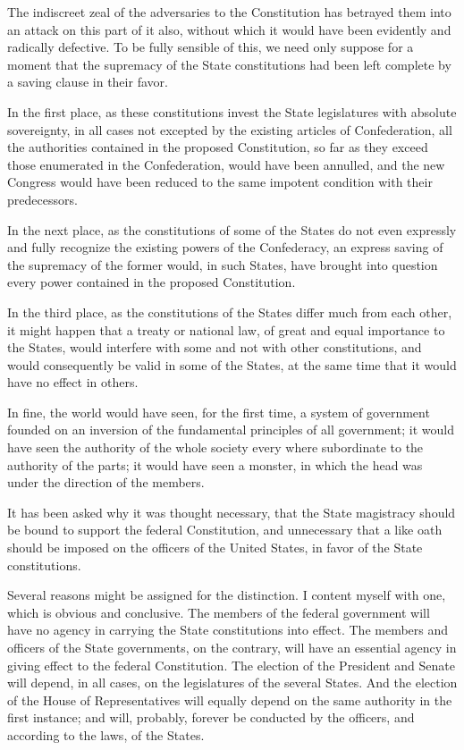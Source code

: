 The indiscreet zeal of the adversaries to the Constitution has betrayed them into an attack on this part of it also, without which it would have been evidently and radically defective. 
To be fully sensible of this, we need only suppose for a moment that the supremacy of the State constitutions had been left complete by a saving clause in their favor.

In the first place, as these constitutions invest the State legislatures with absolute sovereignty, in all cases not excepted by the existing articles of Confederation, all the authorities contained in the proposed Constitution, so far as they exceed those enumerated in the Confederation, would have been annulled, and the new Congress would have been reduced to the same impotent condition with their predecessors.

In the next place, as the constitutions of some of the States do not even expressly and fully recognize the existing powers of the Confederacy, an express saving of the supremacy of the former would, in such States, have brought into question every power contained in the proposed Constitution.

In the third place, as the constitutions of the States differ much from each other, it might happen that a treaty or national law, of great and equal importance to the States, would interfere with some and not with other constitutions, and would consequently be valid in some of the States, at the same time that it would have no effect in others.

In fine, the world would have seen, for the first time, a system of government founded on an inversion of the fundamental principles of all government; it would have seen the authority of the whole society every where subordinate to the authority of the parts; it would have seen a monster, in which the head was under the direction of the members.

It has been asked why it was thought necessary, that the State magistracy should be bound to support the federal Constitution, and unnecessary that a like oath should be imposed on the officers of the United States, in favor of the State constitutions.

Several reasons might be assigned for the distinction. 
I content myself with one, which is obvious and conclusive. 
The members of the federal government will have no agency in carrying the State constitutions into effect. 
The members and officers of the State governments, on the contrary, will have an essential agency in giving effect to the federal Constitution. 
The election of the President and Senate will depend, in all cases, on the legislatures of the several States. 
And the election of the House of Representatives will equally depend on the same authority in the first instance; and will, probably, forever be conducted by the officers, and according to the laws, of the States.

